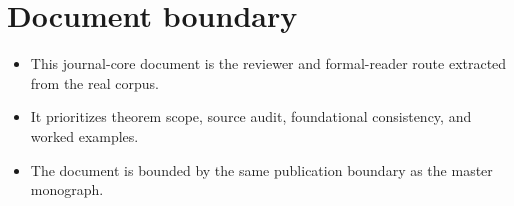 \section*{Document boundary}
\begin{itemize}[leftmargin=*]
\item This journal-core document is the reviewer and formal-reader route extracted from the real corpus.
\item It prioritizes theorem scope, source audit, foundational consistency, and worked examples.
\item The document is bounded by the same publication boundary as the master monograph.
\end{itemize}
